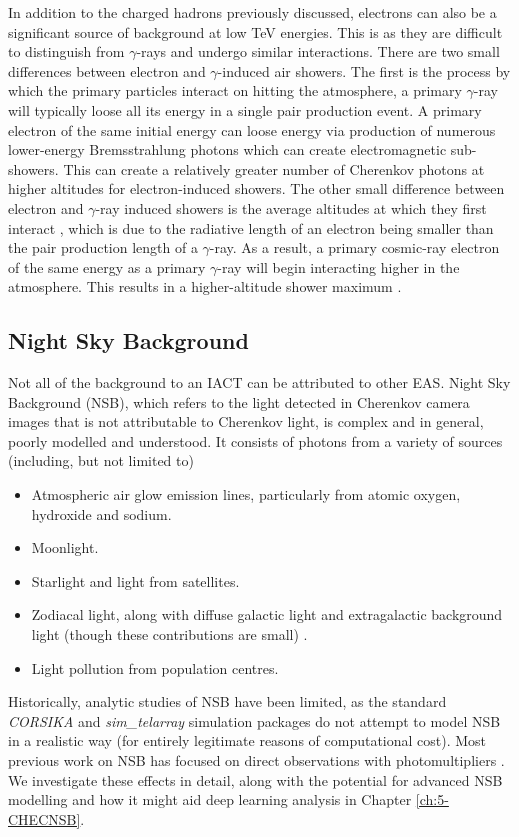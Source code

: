 In addition to the charged hadrons previously discussed, electrons can also be a significant source of background at low TeV energies. This is as they are difficult to distinguish from $\gamma$-rays and undergo similar interactions. There are two small differences between electron and $\gamma$-induced air showers. The first is the process by which the primary particles interact on hitting the atmosphere, a primary $\gamma$-ray will typically loose all its energy in a single pair production event. A primary electron of the same initial energy can loose energy via production of numerous lower-energy Bremsstrahlung photons which can create electromagnetic sub-showers. This can create a relatively greater number of Cherenkov photons at higher altitudes for electron-induced showers. The other small difference between electron and $\gamma$-ray induced showers is the average altitudes at which they first interact \cite{Sitarek1i}, which is due to the radiative length of an electron being smaller than the pair production length of a $\gamma$-ray. As a result, a primary cosmic-ray electron of the same energy as a primary $\gamma$-ray will begin interacting higher in the atmosphere. This results in a higher-altitude shower maximum \cite{lypova}. 

\subsection{Night Sky Background}
Not all of the background to an IACT can be attributed to other EAS. Night Sky Background (NSB), which refers to the light detected in Cherenkov camera images that is not attributable to Cherenkov light, is complex and in general, poorly modelled and understood. It consists of photons from a variety of sources (including, but not limited to)

\begin{itemize}
    \item Atmospheric air glow emission lines, particularly from atomic oxygen, hydroxide and sodium.
    \item Moonlight.
    \item Starlight and light from satellites.
    \item Zodiacal light, along with diffuse galactic light and extragalactic background light (though these contributions are small) \cite{nsbref}.
    \item Light pollution from population centres.
\end{itemize}

Historically, analytic studies of NSB have been limited, as the standard \textit{CORSIKA} and \textit{sim\_telarray} simulation packages do not attempt to model NSB in a realistic way (for entirely legitimate reasons of computational cost). Most previous work on NSB has focused on direct observations with photomultipliers \cite{BandE}. We investigate these effects in detail, along with the potential for advanced NSB modelling and how it might aid deep learning analysis in Chapter \ref{ch:5-CHECNSB}.


